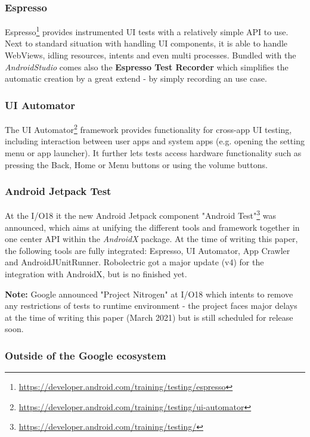 \subsubsection{Espresso}
Espresso\footnote{\url{https://developer.android.com/training/testing/espresso}} provides instrumented UI tests with a relatively simple API to use. Next to standard situation with handling UI components, it is able to handle WebViews, idling resources, intents and even multi processes.
Bundled with the \textit{AndroidStudio} comes also the \textbf{Espresso Test Recorder} which simplifies the automatic creation by a great extend - by simply recording an use case.

\subsubsection{UI Automator}
The UI Automator\footnote{\url{https://developer.android.com/training/testing/ui-automator}} framework provides functionality for cross-app UI testing, including interaction between user apps and system apps (e.g. opening the setting menu or app launcher). It further lets tests access hardware functionality such as pressing the Back, Home or Menu buttons or using the volume buttons.

\subsubsection{Android Jetpack Test}

At the I/O18 it the new Android Jetpack component "Android Test"\footnote{\url{https://developer.android.com/training/testing/}} was announced, which aims at unifying the different tools and framework together in one center API within the \textit{AndroidX} package.
At the time of writing this paper, the following tools are fully integrated: Espresso, UI Automator, App Crawler and AndroidJUnitRunner. Robolectric got a major update (v4) for the integration with AndroidX, but is no finished yet.

\begin{mdframed}[style=InfoBox,align=center]
	\textbf{Note:} Google announced "Project Nitrogen" at I/O18 which intents to remove any restrictions of tests to runtime environment - the project faces major delays at the time of writing this paper (March 2021) but is still scheduled for release soon.
\end{mdframed}

\subsubsection{Outside of the Google ecosystem}

